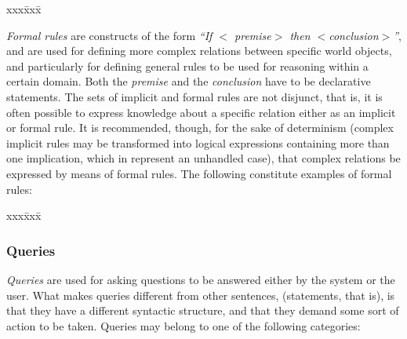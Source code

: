 \begin{tabbing}
  xxx\= xxx\= \kill
  \>\\
  \>
\end{tabbing}

{\em Formal rules\/} are constructs of the form {\em ``If $<${\sl
premise\/}$>$ then $<${\sl conclusion\/}$>$''}, and are used for
defining more complex relations between specific world objects, and
particularly for defining general rules to be used for reasoning
within a certain domain. Both the {\sl premise\/} and the {\sl
conclusion\/} have to be declarative statements. The sets of implicit
and formal rules are not disjunct, that is, it is often possible to
express knowledge about a specific relation either as an implicit or
formal rule. It is recommended, though, for the sake of determinism
(complex implicit rules may be transformed into logical expressions
containing more than one implication, which in {\nash} represent an
unhandled case), that complex relations be expressed by means of
formal rules. The following constitute examples of formal rules:
\label{specrules}

\begin{tabbing}
  xxx\= xxx\= \kill
  \>\\
  \>
\end{tabbing}

\subsubsection{Queries}

{\em Queries\/} are used for asking questions to be answered either by
the system or the user. What makes queries different from other
sentences, (statements, that is), is that they have a different
syntactic structure, and that they demand some sort of action to be
taken. Queries may belong to one of the following categories:

